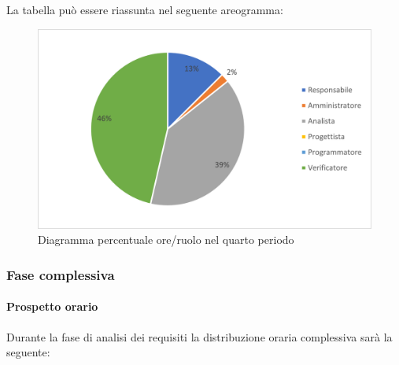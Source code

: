 La tabella può essere riassunta nel seguente areogramma:
\begin{figure}[H]
	\centering
	\includegraphics[width=0.8\linewidth]{res/images/preventivo/dettaglio_analisi/4-2.png}
	\caption{Diagramma percentuale ore/ruolo nel quarto periodo}
	\label{fig:diagramma costi ruolo quarto periodo analisi}
\end{figure}

\subsubsection{Fase complessiva}
\paragraph{Prospetto orario}
Durante la fase di analisi dei requisiti la distribuzione oraria complessiva sarà la seguente:

